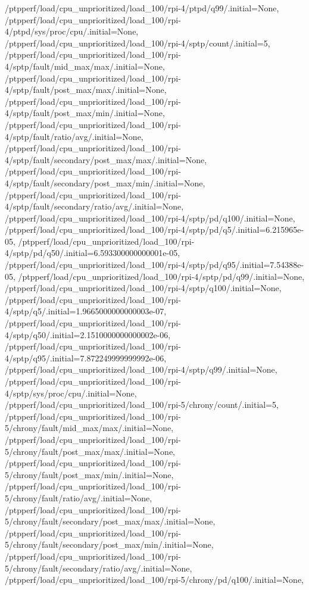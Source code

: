 {    /ptpperf/load/cpu_unprioritized/load_100/rpi-4/ptpd/q99/.initial=None,
    /ptpperf/load/cpu_unprioritized/load_100/rpi-4/ptpd/sys/proc/cpu/.initial=None,
    /ptpperf/load/cpu_unprioritized/load_100/rpi-4/sptp/count/.initial=5,
    /ptpperf/load/cpu_unprioritized/load_100/rpi-4/sptp/fault/mid_max/max/.initial=None,
    /ptpperf/load/cpu_unprioritized/load_100/rpi-4/sptp/fault/post_max/max/.initial=None,
    /ptpperf/load/cpu_unprioritized/load_100/rpi-4/sptp/fault/post_max/min/.initial=None,
    /ptpperf/load/cpu_unprioritized/load_100/rpi-4/sptp/fault/ratio/avg/.initial=None,
    /ptpperf/load/cpu_unprioritized/load_100/rpi-4/sptp/fault/secondary/post_max/max/.initial=None,
    /ptpperf/load/cpu_unprioritized/load_100/rpi-4/sptp/fault/secondary/post_max/min/.initial=None,
    /ptpperf/load/cpu_unprioritized/load_100/rpi-4/sptp/fault/secondary/ratio/avg/.initial=None,
    /ptpperf/load/cpu_unprioritized/load_100/rpi-4/sptp/pd/q100/.initial=None,
    /ptpperf/load/cpu_unprioritized/load_100/rpi-4/sptp/pd/q5/.initial=6.215965e-05,
    /ptpperf/load/cpu_unprioritized/load_100/rpi-4/sptp/pd/q50/.initial=6.593300000000001e-05,
    /ptpperf/load/cpu_unprioritized/load_100/rpi-4/sptp/pd/q95/.initial=7.54388e-05,
    /ptpperf/load/cpu_unprioritized/load_100/rpi-4/sptp/pd/q99/.initial=None,
    /ptpperf/load/cpu_unprioritized/load_100/rpi-4/sptp/q100/.initial=None,
    /ptpperf/load/cpu_unprioritized/load_100/rpi-4/sptp/q5/.initial=1.9665000000000003e-07,
    /ptpperf/load/cpu_unprioritized/load_100/rpi-4/sptp/q50/.initial=2.1510000000000002e-06,
    /ptpperf/load/cpu_unprioritized/load_100/rpi-4/sptp/q95/.initial=7.872249999999992e-06,
    /ptpperf/load/cpu_unprioritized/load_100/rpi-4/sptp/q99/.initial=None,
    /ptpperf/load/cpu_unprioritized/load_100/rpi-4/sptp/sys/proc/cpu/.initial=None,
    /ptpperf/load/cpu_unprioritized/load_100/rpi-5/chrony/count/.initial=5,
    /ptpperf/load/cpu_unprioritized/load_100/rpi-5/chrony/fault/mid_max/max/.initial=None,
    /ptpperf/load/cpu_unprioritized/load_100/rpi-5/chrony/fault/post_max/max/.initial=None,
    /ptpperf/load/cpu_unprioritized/load_100/rpi-5/chrony/fault/post_max/min/.initial=None,
    /ptpperf/load/cpu_unprioritized/load_100/rpi-5/chrony/fault/ratio/avg/.initial=None,
    /ptpperf/load/cpu_unprioritized/load_100/rpi-5/chrony/fault/secondary/post_max/max/.initial=None,
    /ptpperf/load/cpu_unprioritized/load_100/rpi-5/chrony/fault/secondary/post_max/min/.initial=None,
    /ptpperf/load/cpu_unprioritized/load_100/rpi-5/chrony/fault/secondary/ratio/avg/.initial=None,
    /ptpperf/load/cpu_unprioritized/load_100/rpi-5/chrony/pd/q100/.initial=None,
}
